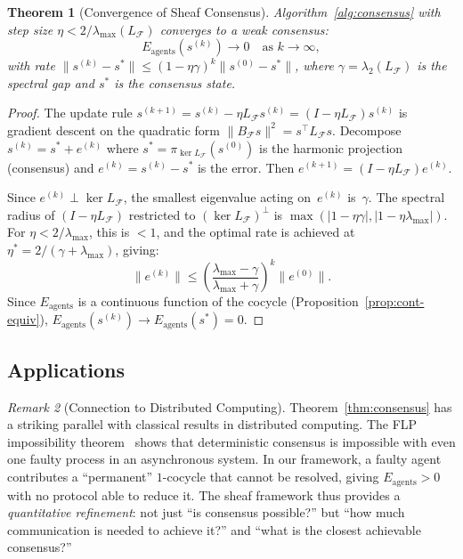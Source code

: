 \documentclass[11pt,a4paper]{article}
\theoremstyle{plain}
\newtheorem{theorem}{Theorem}[section]
\theoremstyle{definition}
\theoremstyle{remark}
\newtheorem{remark}[theorem]{Remark}
\newcommand{\cF}{\mathcal{F}}
\begin{document}
\begin{theorem}[Convergence of Sheaf Consensus]\label{thm:consensus-convergence}
Algorithm~\ref{alg:consensus} with step size $\eta < 2/\lambda_{\max}(L_\cF)$ converges to a weak consensus:
\[
E_{\mathrm{agents}}(s^{(k)}) \to 0 \quad \text{as } k \to \infty,
\]
with rate $\|s^{(k)} - s^*\| \leq (1 - \eta\gamma)^k \|s^{(0)} - s^*\|$, where $\gamma = \lambda_2(L_\cF)$ is the spectral gap and $s^*$ is the consensus state.
\end{theorem}

\begin{proof}
The update rule $s^{(k+1)} = s^{(k)} - \eta L_\cF s^{(k)} = (I - \eta L_\cF)s^{(k)}$ is gradient descent on the quadratic form $\|B_\cF s\|^2 = s^\top L_\cF s$. Decompose $s^{(k)} = s^* + e^{(k)}$ where $s^* = \pi_{\ker L_\cF}(s^{(0)})$ is the harmonic projection (consensus) and $e^{(k)} = s^{(k)} - s^*$ is the error. Then $e^{(k+1)} = (I - \eta L_\cF)e^{(k)}$.

Since $e^{(k)} \perp \ker L_\cF$, the smallest eigenvalue acting on~$e^{(k)}$ is~$\gamma$. The spectral radius of $(I - \eta L_\cF)$ restricted to $(\ker L_\cF)^\perp$ is $\max(|1 - \eta\gamma|, |1 - \eta\lambda_{\max}|)$. For $\eta < 2/\lambda_{\max}$, this is $< 1$, and the optimal rate is achieved at $\eta^* = 2/(\gamma + \lambda_{\max})$, giving:
\[
\|e^{(k)}\| \leq \left(\frac{\lambda_{\max} - \gamma}{\lambda_{\max} + \gamma}\right)^k \|e^{(0)}\|.
\]
Since $E_{\mathrm{agents}}$ is a continuous function of the cocycle (Proposition~\ref{prop:cont-equiv}), $E_{\mathrm{agents}}(s^{(k)}) \to E_{\mathrm{agents}}(s^*) = 0$.
\end{proof}

\subsection{Applications}

\begin{remark}[Connection to Distributed Computing]\label{rem:flp}
Theorem~\ref{thm:consensus} has a striking parallel with classical results in distributed computing. The FLP impossibility theorem~\citep{fischer1985} shows that deterministic consensus is impossible with even one faulty process in an asynchronous system. In our framework, a faulty agent contributes a ``permanent'' $1$-cocycle that cannot be resolved, giving $E_{\mathrm{agents}} > 0$ with no protocol able to reduce it. The sheaf framework thus provides a \emph{quantitative refinement}: not just ``is consensus possible?'' but ``how much communication is needed to achieve it?'' and ``what is the closest achievable consensus?''
\end{remark}
\end{document}
